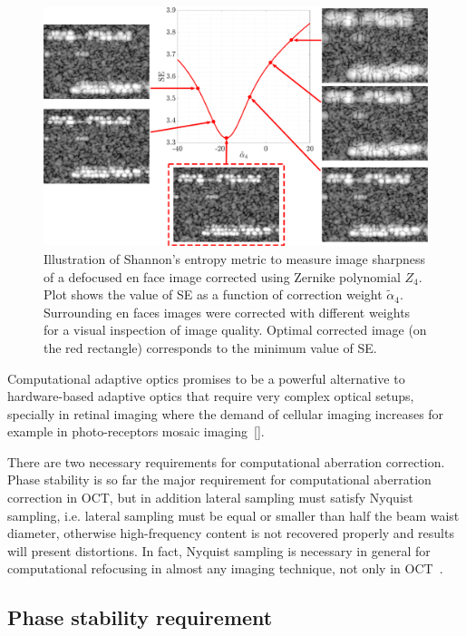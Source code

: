 \begin{figure}[htb!]
	\centering
	\includegraphics[width=\textwidth]{Figures/TheoreticalBasis/SharpnessCAO.pdf}
	\caption{Illustration of Shannon's entropy metric to measure image sharpness of a defocused en face image corrected using Zernike polynomial $Z_4$. Plot shows the value of SE as a function of correction weight $\tilde{\alpha}_4$. Surrounding en faces images were corrected with different weights for a visual inspection of image quality. Optimal corrected image (on the red rectangle) corresponds to the minimum value of SE.}
	\label{fig:Sharpness}
\end{figure}

Computational adaptive optics promises to be a powerful alternative to hardware-based adaptive optics that require very complex optical setups, specially in retinal imaging where the demand of cellular imaging increases for example in photo-receptors mosaic imaging~\ref{}.

There are two necessary requirements for computational aberration correction. Phase stability is so far the major requirement for computational aberration correction in OCT, but in addition lateral sampling must satisfy Nyquist sampling, i.e. lateral sampling must be equal or smaller than half the beam waist diameter, otherwise high-frequency content is not recovered properly and results will present distortions. In fact, Nyquist sampling is necessary in general for computational refocusing in almost any imaging technique, not only in OCT~\cite{}. 

\subsection{Phase stability requirement} \label{sec:phaseStab}

